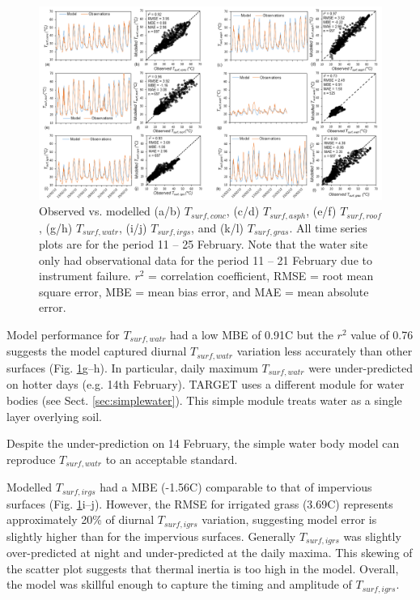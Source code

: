 \documentclass[gmd, manuscript]{copernicus}
\begin{document}
\begin{figure}
\includegraphics[width=1\textwidth]{figure4.png}
\caption{Observed vs. modelled (a/b) $T_{surf,conc}$, (c/d) $ T_{surf,asph}$, (e/f) $T_{surf,roof}$, (g/h) $T_{surf,watr}$, (i/j) $T_{surf,irgs}$, and (k/l)  $T_{surf,gras}$. All time series plots are for the period 11 -- 25 February. Note that the water site only had observational data for the period 11 -- 21 February due to instrument failure. $r^{2}$ = correlation coefficient, RMSE = root mean square error, MBE = mean bias error, and MAE = mean absolute error. }\label{fig:Tsurf_panel}
\end{figure}




Model performance for  $T_{surf,watr}$ had a low MBE of 0.91\degree C but the $r^{2}$ value of 0.76 suggests the model captured diurnal $T_{surf,watr}$  variation less accurately than other surfaces (Fig. \ref{fig:Tsurf_panel}g--h). In particular, daily maximum $T_{surf,watr}$ were under-predicted on hotter days (e.g. 14th February). TARGET uses a different module for water bodies (see Sect. \ref{sec:simplewater}). This simple module treats water as a single layer overlying soil. 
  
Despite the under-prediction on 14 February, the simple water body model can reproduce  $T_{surf,watr}$ to an acceptable standard. 

Modelled $T_{surf,irgs}$ had a MBE (-1.56\degree C) comparable to that of impervious surfaces (Fig. \ref{fig:Tsurf_panel}i--j). However, the RMSE for irrigated grass (3.69\degree C) represents approximately 20\% of diurnal $T_{surf,igrs}$ variation, suggesting model error is slightly higher than for the impervious surfaces. Generally  $T_{surf,igrs}$ was slightly over-predicted at night  and under-predicted at the daily maxima. This skewing of the scatter plot suggests that thermal inertia is too high in the model. Overall, the model was skillful enough to capture the timing and amplitude of  $T_{surf,igrs}$. 
\end{document}
